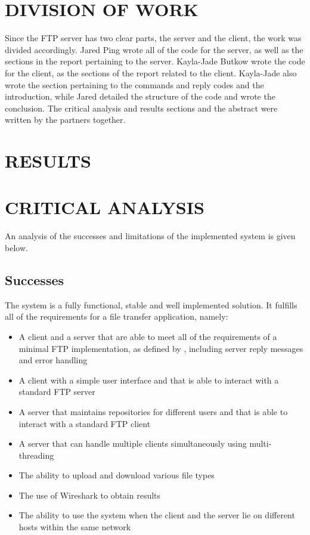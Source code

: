 \documentclass[10pt,twocolumn]{witseiepaper}
\begin{document}
\section{DIVISION OF WORK}
Since the FTP server has two clear parts, the server and the client, the work was divided accordingly. Jared Ping wrote all of the code for the server, as well as the sections in the report pertaining to the server. Kayla-Jade Butkow wrote the code for the client, as the sections of the report related to the client. Kayla-Jade also wrote the section pertaining to the commands and reply codes and the introduction, while Jared detailed the structure of the code and wrote the conclusion. The critical analysis and results sections and the abstract were written by the partners together.

\section{RESULTS}

\section{CRITICAL ANALYSIS}
An analysis of the successes and limitations of the implemented system is given below.

\subsection{Successes}
The system is a fully functional, stable and well implemented solution. It fulfills all of the requirements for a file transfer application, namely:
\begin{itemize}
	\item A client and a server that are able to meet all of the requirements of a minimal FTP implementation, as defined by \cite{rfc}, including server reply messages and error handling
	\item A client with a simple user interface and that is able to interact with a standard FTP server
	\item A server that maintains repositories for different users and that is able to interact with a standard FTP client
	\item A server that can handle multiple clients simultaneously using multi-threading
	\item The ability to upload and download various file types
	\item The use of Wireshark to obtain results
	\item The ability to use the system when the client and the server lie on different hosts within the same network
	
\end{itemize}
\end{document}
